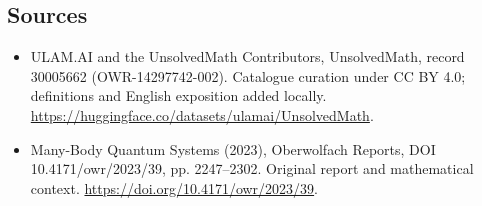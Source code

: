 \documentclass[11pt]{article}
\begin{document}
\subsection{Sources}
\begin{itemize}
\item[\hypertarget{source:30005662:1}{S1}] ULAM.AI and the UnsolvedMath Contributors, UnsolvedMath, record 30005662 (OWR-14297742-002). Catalogue curation under CC BY 4.0; definitions and English exposition added locally.
\url{https://huggingface.co/datasets/ulamai/UnsolvedMath}.
\item[\hypertarget{source:30005662:2}{S2}] Many-Body Quantum Systems (2023), Oberwolfach Reports, DOI 10.4171/owr/2023/39, pp. 2247--2302. Original report and mathematical context.
\url{https://doi.org/10.4171/owr/2023/39}.
\end{itemize}
\label{end:30005662}
\end{document}
